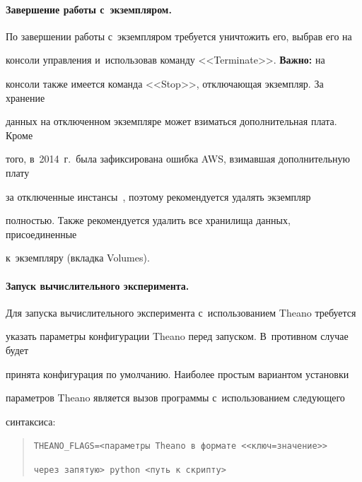 \paragraph*{Завершение работы с~экземпляром.}


По завершении работы с~экземпляром требуется уничтожить его, выбрав его на 


консоли управления и~использовав команду <<Terminate>>. \textbf{Важно:} на 


консоли также имеется команда <<Stop>>, отключающая экземпляр. За хранение 


данных на отключенном экземпляре может взиматься дополнительная плата. Кроме 


того, в~2014~г.\ была зафиксирована ошибка AWS, взимавшая дополнительную плату 


за отключенные инстансы~\cite{bug}, поэтому рекомендуется удалять экземпляр 


полностью. Также рекомендуется удалить все хранилища данных, присоединенные 


к~экземпляру (вкладка Volumes).





\vspace*{-12pt}





\paragraph*{Запуск вычислительного эксперимента.}


Для запуска вычислительного эксперимента с~использованием Theano требуется 


указать параметры конфигурации Theano перед запуском. В~противном случае будет 


принята конфигурация по умолчанию. Наиболее простым вариантом установки 


параметров Theano является вызов программы с~использованием следующего 


синтаксиса:


\begin{quote}


\texttt{THEANO\_FLAGS=<параметры Theano в~формате <<ключ=значение>>}





\texttt{через запятую> python <путь к~скрипту>}


\end{quote}






